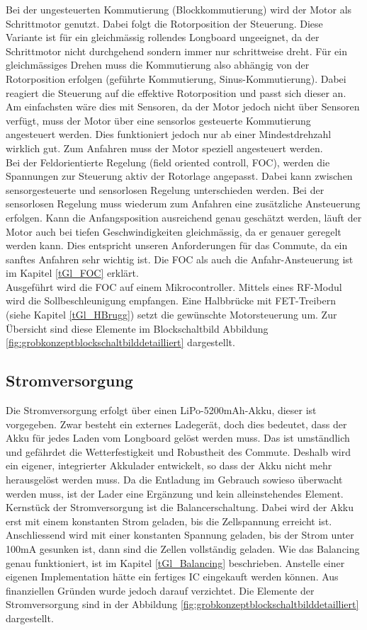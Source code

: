 Bei der ungesteuerten Kommutierung (Blockkommutierung) wird der Motor als Schrittmotor genutzt. Dabei folgt die Rotorposition der Steuerung. Diese Variante ist für ein gleichmässig rollendes Longboard ungeeignet, da der Schrittmotor nicht durchgehend sondern immer nur schrittweise dreht. Für ein gleichmässiges Drehen muss die Kommutierung also abhängig von der Rotorposition erfolgen (geführte Kommutierung, Sinus-Kommutierung). Dabei reagiert die Steuerung auf die effektive Rotorposition und passt sich dieser an. Am einfachsten wäre dies mit Sensoren, da der Motor jedoch nicht über Sensoren verfügt, muss der Motor über eine sensorlos gesteuerte Kommutierung angesteuert werden. Dies funktioniert jedoch nur ab einer Mindestdrehzahl wirklich gut. Zum Anfahren muss der Motor speziell angesteuert werden. \\
Bei der Feldorientierte Regelung (field oriented controll, FOC), werden die Spannungen zur Steuerung aktiv der Rotorlage angepasst. Dabei kann zwischen sensorgesteuerte und sensorlosen Regelung unterschieden werden. Bei der sensorlosen Regelung muss wiederum zum Anfahren eine zusätzliche Ansteuerung erfolgen. Kann die Anfangsposition ausreichend genau geschätzt werden, läuft der Motor auch bei tiefen Geschwindigkeiten gleichmässig, da er genauer geregelt werden kann. Dies entspricht unseren Anforderungen für das Commute, da ein sanftes Anfahren sehr wichtig ist. Die FOC als auch die Anfahr-Ansteuerung ist im Kapitel \ref{tGl_FOC} erklärt.\\
Ausgeführt wird die FOC auf einem Mikrocontroller. Mittels eines RF-Modul wird die Sollbeschleunigung empfangen. Eine Halbbrücke mit FET-Treibern (siehe Kapitel \ref{tGl_HBrugg}) setzt  die gewünschte Motorsteuerung um. Zur Übersicht sind diese Elemente im Blockschaltbild Abbildung \ref{fig:grobkonzeptblockschaltbilddetailliert} dargestellt. 

\subsection*{Stromversorgung}
Die Stromversorgung erfolgt über einen LiPo-5200mAh-Akku, dieser ist vorgegeben. Zwar besteht ein externes Ladegerät, doch dies bedeutet, dass der Akku für jedes Laden vom Longboard gelöst werden muss. Das ist umständlich und gefährdet die Wetterfestigkeit und Robustheit des Commute. Deshalb wird ein eigener, integrierter Akkulader entwickelt, so dass der Akku nicht mehr herausgelöst werden muss. Da die Entladung im Gebrauch sowieso überwacht werden muss, ist der Lader eine Ergänzung und kein alleinstehendes Element. Kernstück der Stromversorgung ist die Balancerschaltung. Dabei wird der Akku erst mit einem konstanten Strom geladen, bis die Zellspannung erreicht ist. Anschliessend wird mit einer konstanten Spannung geladen, bis der Strom unter 100mA gesunken ist, dann sind die Zellen vollständig geladen. Wie das Balancing genau funktioniert, ist im Kapitel \ref{tGl_Balancing} beschrieben. Anstelle einer eigenen Implementation hätte ein fertiges IC eingekauft werden können. Aus finanziellen Gründen wurde jedoch darauf verzichtet. Die Elemente der Stromversorgung sind in der Abbildung \ref{fig:grobkonzeptblockschaltbilddetailliert} dargestellt.

